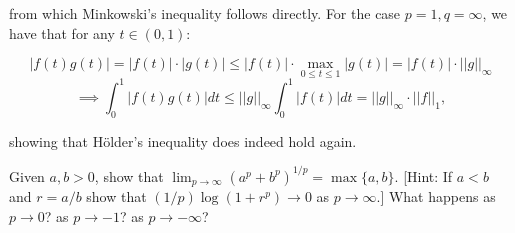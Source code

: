 \begin{solution}
    from which Minkowski's inequality follows directly.
    For the case $p = 1, q = \infty$, we have that for any $t \in (0, 1)$:

    $$\lvert f(t) g(t) \rvert = \lvert f(t) \rvert \cdot \lvert g(t) \rvert \leq \lvert f(t) \rvert \cdot \max_{0 \leq t \leq 1} \lvert g(t) \rvert = \lvert f(t) \rvert \cdot \lvert \lvert g \rvert \rvert_{\infty}$$
    $$\implies \int_{0}^{1} \lvert f(t) g(t) \rvert dt \leq \lvert \lvert g \rvert \rvert_{\infty} \int_{0}^{1} \lvert f(t) \rvert dt = \lvert \lvert g \rvert \rvert_{\infty} \cdot \lvert \lvert f \rvert \rvert_{1},$$

    showing that Hölder's inequality does indeed hold again.
\end{solution}

\begin{exercise}{26}
    Given $a, b > 0$, show that $\lim_{p \rightarrow \infty}(a^p + b^p)^{1/p} = \max\{a, b\}$. [Hint: If $a < b$ and $r = a/b$ show that $(1/p)\log(1 + r^p) \rightarrow 0$ as $p \rightarrow \infty$.] What happens as $p \rightarrow 0$? as $p \rightarrow -1$? as $p \rightarrow -\infty$?
\end{exercise}

